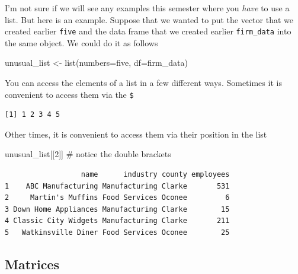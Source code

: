\documentclass[
  letterpaper,
  DIV=11,
  numbers=noendperiod]{scrreprt}
\newenvironment{Shaded}{\begin{snugshade}}{\end{snugshade}}
\newcommand{\AttributeTok}[1]{\textcolor[rgb]{0.40,0.45,0.13}{#1}}
\newcommand{\CommentTok}[1]{\textcolor[rgb]{0.37,0.37,0.37}{#1}}
\newcommand{\DecValTok}[1]{\textcolor[rgb]{0.68,0.00,0.00}{#1}}
\newcommand{\FunctionTok}[1]{\textcolor[rgb]{0.28,0.35,0.67}{#1}}
\newcommand{\NormalTok}[1]{\textcolor[rgb]{0.00,0.23,0.31}{#1}}
\newcommand{\OtherTok}[1]{\textcolor[rgb]{0.00,0.23,0.31}{#1}}
\newcommand{\SpecialCharTok}[1]{\textcolor[rgb]{0.37,0.37,0.37}{#1}}
\begin{document}
I'm not sure if we will see any examples this semester where you
\emph{have} to use a list. But here is an example. Suppose that we
wanted to put the vector that we created earlier \texttt{five} and the
data frame that we created earlier \texttt{firm\_data} into the same
object. We could do it as follows

\begin{Shaded}
\begin{Highlighting}[]
\NormalTok{unusual\_list }\OtherTok{\textless{}{-}} \FunctionTok{list}\NormalTok{(}\AttributeTok{numbers=}\NormalTok{five, }\AttributeTok{df=}\NormalTok{firm\_data)}
\end{Highlighting}
\end{Shaded}

You can access the elements of a list in a few different ways. Sometimes
it is convenient to access them via the \texttt{\$}

\begin{Shaded}
\end{Shaded}

\begin{verbatim}
[1] 1 2 3 4 5
\end{verbatim}

Other times, it is convenient to access them via their position in the
list

\begin{Shaded}
\begin{Highlighting}[]
\NormalTok{unusual\_list[[}\DecValTok{2}\NormalTok{]] }\CommentTok{\# notice the double brackets}
\end{Highlighting}
\end{Shaded}

\begin{verbatim}
                  name      industry county employees
1    ABC Manufacturing Manufacturing Clarke       531
2     Martin's Muffins Food Services Oconee         6
3 Down Home Appliances Manufacturing Clarke        15
4 Classic City Widgets Manufacturing Clarke       211
5   Watkinsville Diner Food Services Oconee        25
\end{verbatim}

\subsection{Matrices}\label{matrices}
\end{document}
